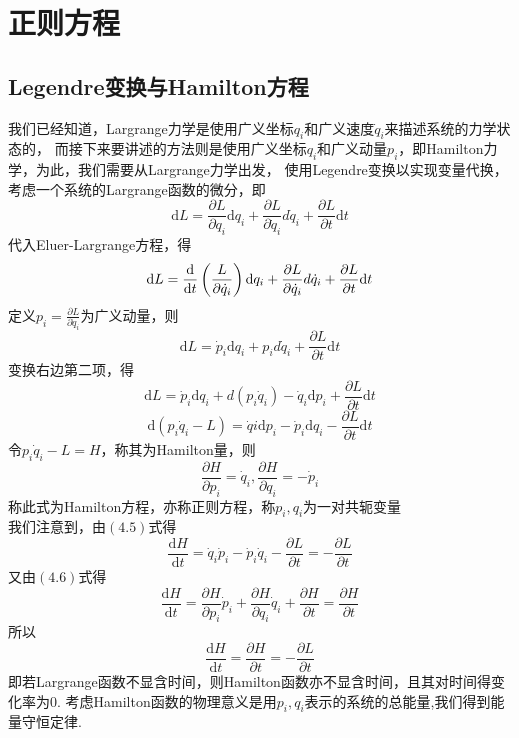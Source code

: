 \chapter{正则方程}
\section{Legendre变换与Hamilton方程}
我们已经知道，Largrange力学是使用广义坐标$q_i$和广义速度$\dot{q}_i$来描述系统的力学状态的，
而接下来要讲述的方法则是使用广义坐标$q_i$和广义动量$p_i$，即Hamilton力学，为此，我们需要从Largrange力学出发，
使用Legendre变换以实现变量代换，考虑一个系统的Largrange函数的微分，即
\begin{equation}
    \mathrm{d}L=\frac{\partial L}{\partial q_i}\mathrm{d}q_i+\frac{\partial L}{\partial\dot{q}_i}d\dot{q}_i+\frac{\partial L}{\partial t}\mathrm{d}t
\end{equation}
代入Eluer-Largrange方程，得
\begin{equation}
    \mathrm{d}L=\frac{\rm d}{\mathrm{d}t}\left(\frac{L}{\partial \dot{q}_i}\right)\mathrm{d}q_i+\frac{\partial L}{\partial\dot{q}_i}d\dot{q}_i
    +\frac{\partial L}{\partial t}\mathrm{d}t
\end{equation}
定义$\displaystyle{p_i=\frac{\partial L}{\partial \dot{q}_i}}$为广义动量，则
\begin{equation}
    \mathrm{d}L=\dot{p}_i\mathrm{d}q_i+p_id\dot{q}_i+\frac{\partial L}{\partial t}\mathrm{d}t
\end{equation}
变换右边第二项，得
\begin{equation}
    \mathrm{d}L=\dot{p}_i\mathrm{d}q_i+d\left(p_i\dot{q}_i\right)-\dot{q}_i\mathrm{d}p_i+\frac{\partial L}{\partial t}\mathrm{d}t
\end{equation}
\begin{equation}
    \mathrm{d}\left(p_i\dot{q}_i-L\right)=\dot{q}i\mathrm{d}p_i-\dot{p}_i\mathrm{d}q_i-\frac{\partial L}{\partial t}\mathrm{d}t
\end{equation}
令$p_i\dot{q}_i-L=H$，称其为Hamilton量，则
\begin{equation}
    \frac{\partial H}{\partial p_i}=\dot{q}_i,\frac{\partial H}{\partial q_i}=-\dot{p}_i
\end{equation}
称此式为Hamilton方程，亦称正则方程，称$p_i,q_i$为一对共轭变量\\
我们注意到，由$(4.5)$式得
\begin{equation}
    \frac{\mathrm{d}H}{\mathrm{d}t}=\dot{q}_i\dot{p}_i-\dot{p}_i\dot{q}_i-\frac{\partial L}{\partial t}=-\frac{\partial L}{\partial t}
\end{equation}
又由$(4.6)$式得
\begin{equation}
    \frac{\mathrm{d}H}{\mathrm{d}t}=\frac{\partial H}{\partial p_i}\dot{p}_i+\frac{\partial H}{\partial q_i}\dot{q}_i
    +\frac{\partial H}{\partial t}=\frac{\partial H}{\partial t}
\end{equation}
所以
\begin{equation}
    \frac{\mathrm{d}H}{\mathrm{d}t}=\frac{\partial H}{\partial t}=-\frac{\partial L}{\partial t}
\end{equation}
即若Largrange函数不显含时间，则Hamilton函数亦不显含时间，且其对时间得变化率为0.
考虑Hamilton函数的物理意义是用$p_i,q_i$表示的系统的总能量,我们得到能量守恒定律.
